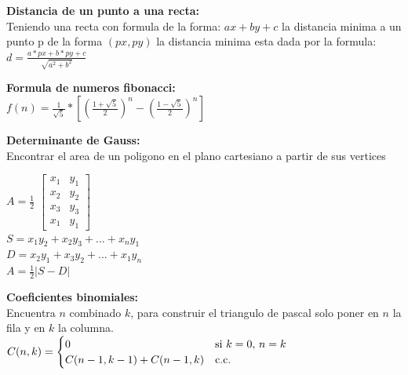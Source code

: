\documentclass[10pt,landscape,twocolumn,a4paper,notitlepage]{article}
\begin{document}
			\vspace{8mm}
			\textbf{Distancia de un punto a una recta:}\\
			Teniendo una recta con formula de la forma: $ax + by + c$ la distancia minima
			a un punto p de la forma $(px, py)$ la distancia minima esta dada por la formula:\\
			\vspace{3mm}
			{\Large $d = \frac{a*px + b*py + c}{\sqrt{a^{2} + b^{2}}}$}
			
			\vspace{8mm}
			\textbf{Formula de numeros fibonacci:}\\
			\vspace{3mm}
			{\Large $f(n) = \frac{1}{\sqrt{5}} * [ (\frac{1 + \sqrt{5}}{2})^{n}  - (\frac{1 - \sqrt{5}}{2})^{n}]$ }
			
			\vspace{8mm}
			\textbf{Determinante de Gauss:}\\ 
			Encontrar el area de un poligono en el plano cartesiano a partir de sus vertices\\
			\vspace{3mm}		
			
			{\large$A = \frac{1}{2} $}
			{\large $ \begin{bmatrix}
				x_{1} & y_{1} \\ 
				x_{2} & y_{2} \\ 
				x_{3} & y_{3} \\ 
				x_{1} & y_{1} 
			\end{bmatrix}$ } \\ 
			\vspace{3mm}
			{\large $S = x_{1}y_{2} + x_{2}y_{3} +...+ x_{n}y_{1}$} \\ 
			\vspace{3mm}
			{\large $D = x_{2}y_{1} + x_{3}y_{2} +...+ x_{1}y_{n}$} \\ 
			\vspace{3mm}
			{\large $A = \frac{1}{2} |S - D|$}
			
			\vspace{8mm}
			\textbf{Coeficientes binomiales:}\\
			Encuentra $n$ combinado $k$, para construir el triangulo de pascal solo poner
			en $n$ la fila y en $k$ la columna.\\
			$C(n, k) = 	
			\begin{cases}
				0 & \text{si $k = 0, $ $ n = k$}\\
				C(n-1,k-1)+C(n-1,k) & \text{c.c.}
			\end{cases}
			$\\
			
\end{document}

